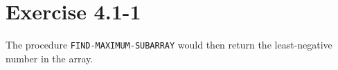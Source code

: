 \documentclass{article}
\begin{document}
\section*{Exercise 4.1-1}

The procedure \texttt{FIND-MAXIMUM-SUBARRAY} would then return the least-negative number in the array.
\end{document}
